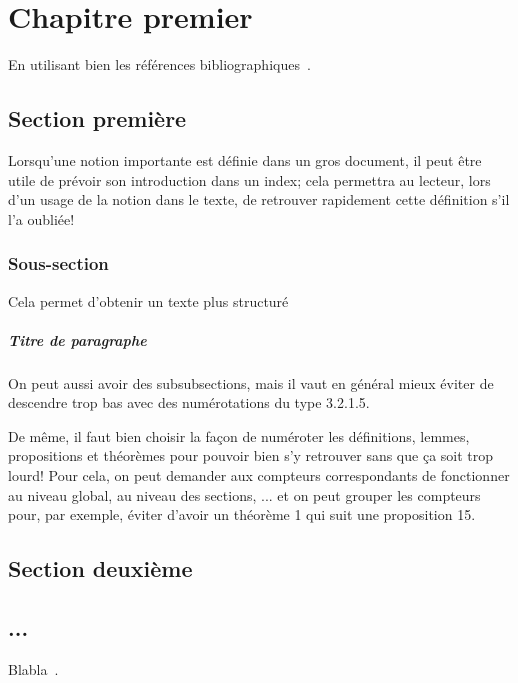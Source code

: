 
\chapter{Chapitre premier}

En utilisant bien les références bibliographiques~\cite{ref1,ref3}.

\section{Section première}
Lorsqu'une notion importante est définie dans un gros document, il peut être utile de prévoir son introduction dans un index; cela permettra au lecteur, lors d'un usage de la notion dans le texte, de retrouver rapidement cette définition s'il l'a oubliée!
\subsection{Sous-section}
Cela permet d'obtenir un texte plus structuré
\paragraph{Titre de paragraphe}
On peut aussi avoir des subsubsections, mais il vaut en général mieux éviter de descendre trop bas avec des numérotations du type 3.2.1.5.

De même, il faut bien choisir la façon de numéroter les définitions, lemmes, propositions et théorèmes pour pouvoir bien s'y retrouver sans que ça soit trop lourd! Pour cela, on peut demander aux compteurs correspondants de fonctionner au niveau global, au niveau des sections, ... et on peut grouper les compteurs pour, par exemple, éviter d'avoir un théorème 1 qui suit une proposition 15.
\section{Section deuxième}
\section{...}Blabla~\cite{ref2}.